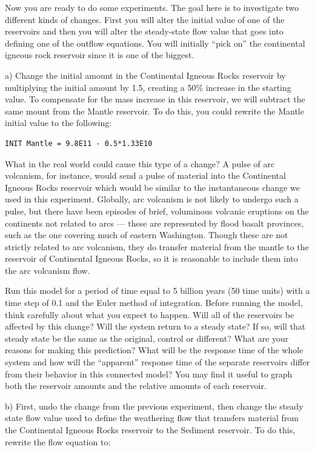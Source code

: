 \documentclass[11pt,letterpaper]{article}
\begin{document}
Now you are ready to do some experiments. The goal here is to investigate two different kinds of changes. First you will alter the initial value of one of the reservoirs and then you will alter the steady-state flow value that goes into defining one of the outflow equations. You will initially ``pick on'' the continental igneous rock reservoir since it is one of the biggest.
\bigskip

a) Change the initial amount in the Continental Igneous Rocks reservoir by multiplying the initial amount by 1.5, creating a 50\% increase in the starting value. To compensate for the mass increase in this reservoir, we will subtract the same mount from the Mantle reservoir. To do this, you could rewrite the Mantle initial value to the following:

\begin{verbatim}
INIT Mantle = 9.8E11 - 0.5*1.33E10
\end{verbatim}

What in the real world could cause this type of a change? A pulse of arc volcanism, for instance, would send a pulse of material into the Continental Igneous Rocks reservoir which would be similar to the instantaneous change we used in this experiment. Globally, arc volcanism is not likely to undergo such a pulse, but there have been episodes of brief, voluminous volcanic eruptions on the continents not related to arcs --- these are represented by flood basalt provinces, such as the one covering much of eastern Washington. Though these are not strictly related to arc volcanism, they do transfer material from the mantle to the reservoir of Continental Igneous Rocks, so it is reasonable to include them into the arc volcanism flow.

Run this model for a period of time equal to 5 billion years (50 time units) with a time step of 0.1 and the Euler method of integration. Before running the model, think carefully about what you expect to happen. Will all of the reservoirs be affected by this change? Will the system return to a steady state? If so, will that steady state be the same as the original, control or different? What are your reasons for making this prediction? What will be the response time of the whole system and how will the ``apparent'' response time of the separate reservoirs differ from their behavior in this connected model? You may find it useful to graph both the reservoir amounts and the relative amounts of each reservoir.
\bigskip

b) First, undo the change from the previous experiment, then change the steady state flow value used to define the weathering flow that transfers material from the Continental Igneous Rocks reservoir to the Sediment reservoir. To do this, rewrite the flow equation to:
\end{document}
